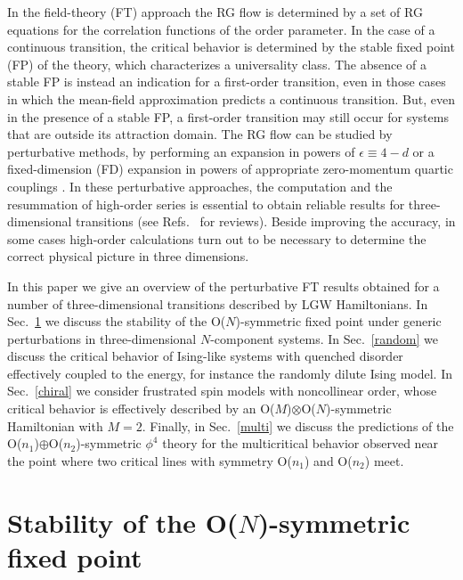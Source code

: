 \documentclass[a4paper,12pt]{article}
\begin{document}
In the field-theory (FT) approach the RG flow 
is determined by a set of RG
equations for the correlation functions of the order parameter.
In the case of a continuous transition, 
the critical behavior is determined by the stable fixed point (FP)
of the theory, which characterizes a universality class. 
The absence of a stable FP is instead 
an indication for a first-order transition,
even in those cases in which the mean-field approximation predicts
a continuous transition.
But, even in the presence of a stable FP,
a first-order transition may  still occur
for systems that are outside its attraction domain. 
The RG flow can be studied by perturbative methods, by performing an 
expansion in powers of $\epsilon\equiv 4-d$\cite{WF-72} or a 
fixed-dimension (FD) expansion in powers of appropriate zero-momentum
quartic couplings \cite{Parisi-80}. 
In these perturbative approaches,
the computation and the resummation of high-order series
is essential to obtain reliable results for three-dimensional transitions
(see Refs.~\cite{Zinn-Justin-book,review} for reviews). 
Beside improving the accuracy, in some cases high-order
calculations turn out to be necessary to determine 
the correct physical picture in three dimensions.

In this paper we give an overview of the perturbative FT
results obtained for a number of three-dimensional transitions 
described by LGW Hamiltonians.
In Sec.~\ref{onstab} we discuss the stability of the 
O($N$)-symmetric fixed point under generic perturbations in  
three-dimensional $N$-component systems.
In Sec.~\ref{random} we discuss the critical behavior
of Ising-like systems with quenched disorder
effectively coupled to the energy, for instance the 
randomly dilute Ising model.
In Sec.~\ref{chiral} we consider frustrated spin models
with noncollinear order, whose critical behavior is effectively described
by an O($M$)$\otimes$O($N$)-symmetric Hamiltonian with $M=2$.
Finally, in Sec.~\ref{multi} we discuss the predictions of 
the O($n_1$)$\oplus$O($n_2$)-symmetric $\phi^4$ theory for 
the multicritical behavior observed near the point
where two critical lines with symmetry O($n_1$) and O($n_2$) meet.


\section{Stability of the O($N$)-symmetric fixed point}
\label{onstab}
\end{document}
